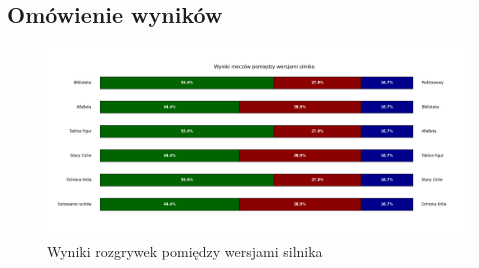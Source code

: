 \subsection{Omówienie wyników}
\label{subsec:omowienie-wynikow}

\begin{figure}[ht]
    \centering
    \includegraphics[width=1\linewidth]{rozdzialy/rozdzial03/1_porownanie-wersji-silnika/rysunki/gry-wyniki}
    \caption{Wyniki rozgrywek pomiędzy wersjami silnika}
    \label{fig:wyniki-wersje}
\end{figure}